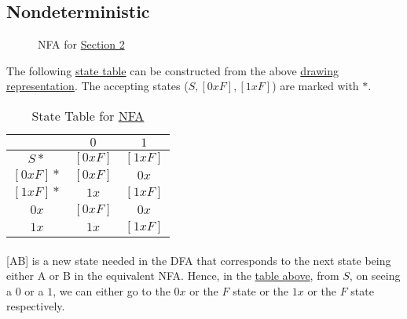 \documentclass[11pt,letterpaper]{article}
\begin{document}
\subsection{Nondeterministic}
\begin{figure}[!ht]
\label{fig:nfa}
\centering
{}
\caption{NFA for \hyperref[sec:s2]{Section 2}}
\end{figure}
The following \hyperref[tab:nfa]{state table} can be constructed from the above \hyperref[fig:nfa]{drawing representation}. The accepting states ($S,[0xF],[1xF]$) are marked with $*$.
\begin{table}[!ht]
\label{tab:nfa}
\centering
\begin{tabular}{c| c c}
     & $0$ & $1$  \\
    \hline
    $S*$ & $[0xF]$ & $[1xF]$ \\
    $[0xF]*$ & $[0xF]$ & $0x$ \\
    $[1xF]*$ & $1x$ & $[1xF]$ \\
    $0x$ & $[0xF]$ & $0x$ \\
    $1x$ & $1x$ & $[1xF]$
\end{tabular}
\caption{State Table for \hyperref[fig:nfa]{NFA}}
\end{table}
\paragraph{}
\small [AB] is a new state needed in the DFA that corresponds to the next state being either A or B in the equivalent NFA. Hence, in the \hyperref[tab:nfa]{table above}, from $S$, on seeing a $0$ or a $1$, we can either go to the $0x$ or the $F$ state or the $1x$ or the $F$ state respectively.
\end{document}
